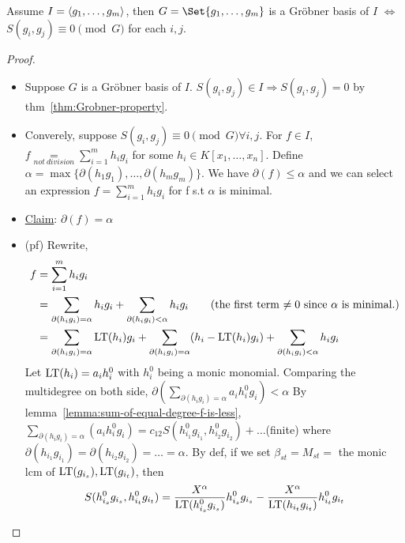 \begin{theorem}
  Assume $I = \langle g_1, \dots, g_m \rangle$, then
  $G = \Set{g_1, \dots, g_m}$ is a Gr\"{o}bner basis of $I$ $\iff$
  $S(g_i, g_j) \equiv 0 \pmod{G}$ for each $i, j$.
  \begin{proof} \mbox{}
    \begin{itemize}
      \item Suppose $G$ is a Gr\"{o}bner basis of $I$.
        $S(g_i, g_j) \in I \Rightarrow S(g_i, g_j) = 0$
        by thm~\ref{thm:Grobner-property}.
      \item Converely, suppose $S(g_i, g_j) \equiv 0 \pmod G \forall i, j$.
        For $f \in I$, $f \underset{not\ division}{=}
        \sum\limits_{i=1}^m h_ig_i$ for some $h_i \in K[x_1,\dots,x_n]$.
        Define $\alpha = \max\{\partial(h_1g_1),\dots,\partial(h_mg_m)\}$.
        We have $\partial(f) \leq \alpha$ and we can select an expression
        $f = \sum\limits_{i=1}^m h_ig_i$ for f s.t $\alpha$ is minimal.
      \item \uline{Claim}: $\partial(f) = \alpha$
      \item (pf) Rewrite,
        \[
          \begin{split}
            f &= \sum_{i = 1}^m h_ig_i \\
            &= \sum_{\partial(h_ig_i) = \alpha} h_ig_i
              + \sum_{\partial(h_ig_i) < \alpha} h_ig_i
              \qquad (\text{the first term $\neq 0$ since $\alpha$ is minimal.}) \\
            &= \sum_{\partial(h_ig_i) = \alpha} \operatorname{LT}(h_i)g_i
              + \sum_{\partial(h_ig_i) = \alpha} (h_i-\operatorname{LT}(h_i)g_i)
              + \sum_{\partial(h_ig_i) < \alpha} h_ig_i
          \end{split}
        \]
        Let $\operatorname{LT}(h_i) = a_ih_i^0$ with $h_i^0$ being a monic monomial.
        Comparing the multidegree on both side,
        $\partial\left(\sum\limits_{\partial(h_ig_i) = \alpha} a_ih_i^0g_i\right)
        < \alpha$ By lemma~\ref{lemma:sum-of-equal-degree-f-is-less},
        $\underset{\partial(h_ig_i) = \alpha}{\sum}\left(a_ih_i^0g_i\right) = c_{12}S(h_{i_1}^0g_{i_1},h_{i_2}^0g_{i_2}) + \dots$(finite) where $\partial(h_{i_1}g_{i_1}) = \partial(h_{i_2}g_{i_2}) = \dots = \alpha $. By def, if we set $\beta_{st} = M_{st} =$ the monic lcm of $\operatorname{LT}(g_{i_s}), \operatorname{LT}(g_{i_t})$, then
        \[
          \begin{split}
            S(h_{i_s}^0g_{i_s}, h_{i_t}^0g_{i_t}) &= \frac{X^\alpha}{\LT(h_{i_s}^0g_{i_s})}h_{i_s}^0g_{i_s} - \frac{X^\alpha}{\LT(h_{i_t}g_{i_t})}h_{i_t}^0g_{i_t} \\

\end{split}\]
\end{itemize}
\end{proof}
\end{theorem}
